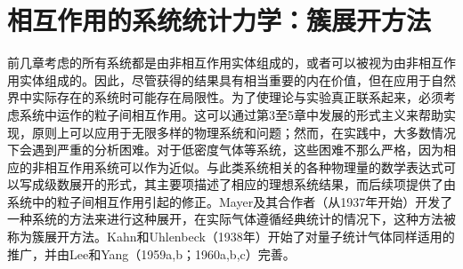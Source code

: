 ﻿\chapter{相互作用的系统统计力学：簇展开方法}\label{ux76f8ux4e92ux4f5cux7528ux7684ux7cfbux7edfux7edfux8ba1ux529bux5b66ux7c07ux5c55ux5f00ux65b9ux6cd5}
前几章考虑的所有系统都是由非相互作用实体组成的，或者可以被视为由非相互作用实体组成的。因此，尽管获得的结果具有相当重要的内在价值，但在应用于自然界中实际存在的系统时可能存在局限性。为了使理论与实验真正联系起来，必须考虑系统中运作的粒子间相互作用。这可以通过第3至5章中发展的形式主义来帮助实现，原则上可以应用于无限多样的物理系统和问题；然而，在实践中，大多数情况下会遇到严重的分析困难。对于低密度气体等系统，这些困难不那么严格，因为相应的非相互作用系统可以作为近似。与此类系统相关的各种物理量的数学表达式可以写成级数展开的形式，其主要项描述了相应的理想系统结果，而后续项提供了由系统中的粒子间相互作用引起的修正。Mayer及其合作者（从1937年开始）开发了一种系统的方法来进行这种展开，在实际气体遵循经典统计的情况下，这种方法被称为簇展开方法。Kahn和Uhlenbeck（1938年）开始了对量子统计气体同样适用的推广，并由Lee和Yang（1959a,b；1960a,b,c）完善。
